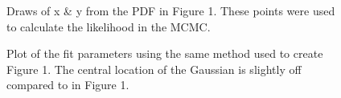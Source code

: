 \documentclass[twocolumn,11pt]{article}
\begin{document}
\begin{figure}[!h]
	\centering
	\noindent
      \caption{Draws of x \& y from the PDF in Figure 1. These points were used to calculate the likelihood in the MCMC.}
\end{figure}

\begin{figure}[!h]
	\centering
	\noindent
      \caption{Plot of the fit parameters using the same method used to create Figure 1. The central location of the Gaussian is slightly off compared to in Figure 1.}
\end{figure}
\end{document}
